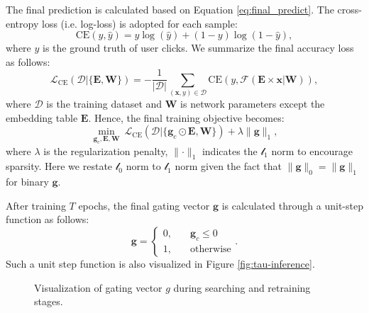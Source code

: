 \documentclass[sigconf]{acmart}
\begin{document}
The final prediction is calculated based on Equation \ref{eq:final_predict}. The cross-entropy loss (i.e. log-loss) is adopted for each sample:
\begin{equation}
\label{eq:logloss}
    \text{CE} (y,\hat{y}) = y\log(\hat{y}) + (1-y)\log(1-\hat{y}),
\end{equation}
where $y$ is the ground truth of user clicks. We summarize the final accuracy loss as follows:
\begin{equation}
\label{eq:summarize}
    \mathcal{L}_{\text{CE}}(\mathcal{D}|\{\mathbf{E}, \mathbf{W}\}) = -\frac{1}{ |\mathcal{D}|} \sum_{(\mathbf{x}, y)\in\mathcal{D}} \text{CE}(y, \mathcal{F}(\mathbf{E} \times \mathbf{x}|\mathbf{W})),
\end{equation}
where $\mathcal{D}$ is the training dataset and $\mathbf{W}$ is network parameters except the embedding table $\mathbf{E}$. Hence, the final training objective becomes:
\begin{equation}
\label{eq:loss_search}
    \min_{\mathbf{g}_c, \mathbf{E}, \mathbf{W}} \ \mathcal{L}_{\text{CE}}(\mathcal{D}|\{\mathbf{g}_c \odot \mathbf{E}, \mathbf{W}\}) + \lambda \lVert \mathbf{g} \rVert_1,
\end{equation}
where $\lambda$ is the regularization penalty, $\lVert \cdot \rVert_1$ indicates the $\mathcal{l}_1$ norm to encourage sparsity. Here we restate $\mathcal{l}_0$ norm to $\mathcal{l}_1$ norm given the fact that $\lVert \mathbf{g} \rVert_0 = \lVert \mathbf{g}\rVert_1$ for binary $\mathbf{g}$.

After training $T$ epochs, the final gating vector $\mathbf{g}$ is calculated through a unit-step function as follows:
\begin{equation}
\label{eq:discretization}
    \mathbf{g} = 
\begin{cases}
    0,\quad &\mathbf{g}_c \leq 0 \\
    1,\quad &\text{otherwise}
\end{cases}.
\end{equation}
Such a unit step function is also visualized in Figure \ref{fig:tau-inference}.

\begin{figure}[!htbp]
    \centering
    \vspace{-10pt}
    \caption{Visualization of gating vector $g$ during searching and retraining stages.}
    \vspace{-5pt}
    \label{fig:tau}
\end{figure}
\end{document}
